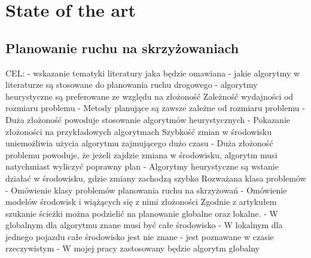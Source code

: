 \chapter{State of the art} \label{chap:state-of-the-art}

\section{Planowanie ruchu na skrzyżowaniach}

CEL:
\newline
- wskazanie tematyki literatury jaka będzie omawiana
\newline
- jakie algorytmy w literaturze są stosowane do planowania ruchu drogowego
\newline
- algorytmy heurystyczne są preferowane ze względu na złożoność
\newline
\newline
Zależność wydajności od rozmiaru problemu
\newline
- Metody planujące są zawsze zależne od rozmiaru problemu
\newline
- Duża złożoność powoduje stosowanie algorytmów heurystycznych
\newline
- Pokazanie złożoności na przykładowych algorytmach
\newline
\newline
Szybkość zmian w środowisku uniemożliwia użycia algorytmu zajmującego dużo czasu
\newline
- Duża złożoność problemu powoduje, że jeżeli zajdzie zmiana w środowisku, algorytm musi natychmiast wyliczyć poprawny plan
\newline
- Algorytmy heurystyczne są wstanie działać w środowisku, gdzie zmiany zachodzą szybko
\newline
\newline
Rozważana klasa problemów
\newline
- Omówienie klasy problemów planowania ruchu na skrzyżowań
\newline
- Omówienie modelów środowisk i wiążących się z nimi złożoności
\newline
\newline
Zgodnie z artykułem ~\cite{leena2014survey} szukanie ścieżki można podzielić na planowanie globalne oraz lokalne.
\newline
- W globalnym dla algorytmu znane musi być całe środowisko
\newline
- W lokalnym dla jednego pojazdu całe środowisko jest nie znane - jest poznawane w czasie rzeczywistym
\newline
- W mojej pracy zastosowany będzie algorytm globalny


